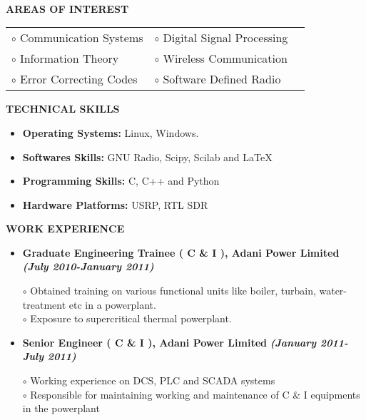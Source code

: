\documentclass[a4paper,10pt]{article}
\begin{document}
{\qquad \\ \\ \\ \\ \\ \\ \\ \\ \\ \\ \\ \\ \\}

\colorbox{titleColor}{\parbox{6.5in}{\textbf{AREAS OF INTEREST}}}

 \begin{tabular}{p{3.5in}p{5in}p{3.5in}}
    $\circ$ Communication Systems        &$\circ$ Digital Signal Processing \\
    $\circ$ Information Theory       	  &$\circ$ Wireless Communication \\
    $\circ$ Error Correcting Codes	  &$\circ$ Software Defined Radio \\
  \end{tabular}

 \colorbox{titleColor}{\parbox{6.5in}{\textbf{TECHNICAL SKILLS}}}
 \begin{itemize}
 \setlength{\itemsep}{1pt}
 \item \textbf{{Operating Systems:}} Linux, Windows.
 \item \textbf{{Softwares Skills:}} GNU Radio, Scipy, Scilab and \LaTeX
 \item \textbf{{Programming Skills:}} C, C++ and Python
 \item \textbf{{Hardware Platforms:}} USRP, RTL SDR
 \end{itemize}

 \colorbox{titleColor}{\parbox{6.5in}{\textbf{WORK EXPERIENCE}}}

 \begin{itemize}
 \setlength{\itemsep}{1pt}
 \item \textbf{Graduate Engineering Trainee ( C \& I ), Adani Power Limited}  \textbf \emph{(July 2010-January 2011)}
 
 $\circ$ Obtained training on various functional units like boiler, turbain, water-treatment etc in a powerplant.\\
 $\circ$ Exposure to supercritical thermal powerplant.
 \item \textbf{Senior Engineer ( C \& I ), Adani Power Limited}  \textbf \emph{(January 2011-July 2011)}
 
 $\circ$ Working experience on DCS, PLC and SCADA systems \\
 $\circ$ Responsible for maintaining working and maintenance of C \& I equipments in the powerplant \\

\end{itemize}
\end{document}
